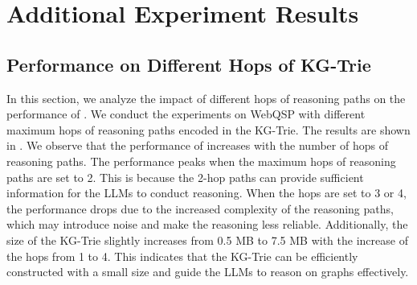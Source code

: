 \section{Additional Experiment Results}\label{app:results}

\subsection{Performance on Different Hops of KG-Trie}\label{app:hops}
In this section, we analyze the impact of different hops of reasoning paths on the performance of \ourmethod. We conduct the experiments on WebQSP with different maximum hops of reasoning paths encoded in the KG-Trie. The results are shown in . We observe that the performance of \ourmethod increases with the number of hops of reasoning paths. The performance peaks when the maximum hops of reasoning paths are set to 2. This is because the 2-hop paths can provide sufficient information for the LLMs to conduct reasoning. When the hops are set to 3 or 4, the performance drops due to the increased complexity of the reasoning paths, which may introduce noise and make the reasoning less reliable. Additionally, the size of the KG-Trie slightly increases from 0.5 MB to 7.5 MB with the increase of the hops from 1 to 4. This indicates that the KG-Trie can be efficiently constructed with a small size and guide the LLMs to reason on graphs effectively.



